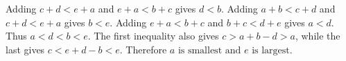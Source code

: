 Adding $ c+d<e+a $ and $ e+a<b+c $ gives $ d<b $. Adding $ a+b<c+d $ and $ c+d<e+a $ gives $ b<e $. Adding $ e+a<b+c $ and $ b+c<d+e $ gives $ a<d $. Thus $ a<d<b<e $. The first inequality also gives $ c>a+b-d>a $, while the last gives $ c<e+d-b<e $. Therefore $\boxed{a\text{ is smallest and }e\text{ is largest}}$.
